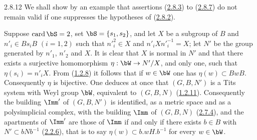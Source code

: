 \documentclass[12pt,a4paper,oneside,english]{smfart}
\makeatletter
\newcommand{\btanchor}[1]{\leavevmode\Hy@raisedlink{\hypertarget{bt:#1}{}}}
\newcommand{\btpageanchor}[1]{\Hy@raisedlink{\hypertarget{p:#1}{}}}
\newcommand{\btref}[1]{\hyperlink{bt:#1}{#1}}
\newcommand{\btpage}[1]{\marginnote{p.~#1}\btpageanchor{#1}}
\newcommand{\pagemark}[1]{\btpage{#1}}
\theoremstyle{definition}
\theoremstyle{bt}
\makeatother
\begin{document}
\num{2.8.12}\btanchor{2.8.12}
We shall show by an example that assertions (\btref{2.8.3}) to (\btref{2.8.7}) do not remain
valid if one suppresses the hypotheses of (\btref{2.8.2}).

Suppose $\operatorname{card}\bS=2$, set $\bS=\{s_1,s_2\}$, and let $X$ be a
subgroup of $B$ and $n'_i\in Bs_iB$ $(i=1,2)$ such that $n'^2_i\in X$ and
$n'_iXn'^{-1}_i=X$; let $N'$ be the group generated by $n'_1$, $n'_2$ and $X$.
It is clear that $X$ is normal in $N'$ and that there exists a surjective
homomorphism $\eta:\bW\to N'/X$, and only one, such that $\eta(s_i)=n'_iX$.
From (\btref{1.2.8}) it follows that if $w\in\bW$ one has $\eta(w)\subset BwB$.
Consequently $\eta$ is bijective. One deduces at once that $(G,B,N')$ is a
\pagemark{57}
Tits system with Weyl group $\bW$, equivalent to $(G,B,N)$ (\btref{1.2.11}).
Consequently the building $\Imm'$ of $(G,B,N')$ is identified, as a metric
space and as a polysimplicial complex, with the building $\Imm$ of $(G,B,N)$
(\btref{2.7.4}), and the apartments of $\Imm'$ are those of $\Imm$ if and only if
there exists $b\in B$ with $N'\subset bNb^{-1}$ (\btref{2.2.6}), that is to say
$\eta(w)\subset b.w H.b^{-1}$ for every $w\in\bW$.
\end{document}

